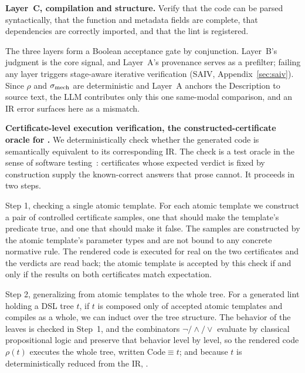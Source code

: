 \textbf{Layer~C, compilation and structure.} Verify that the code can be parsed
syntactically, that the function and metadata fields are complete, that
dependencies are correctly imported, and that the lint is registered.

The three layers form a Boolean acceptance gate by conjunction. Layer~B's
judgment is the core signal, and Layer~A's provenance serves as a
prefilter; failing any layer triggers stage-aware iterative verification
(SAIV, Appendix~\ref{sec:saiv}).
Since $\rho$ and $\sigma_{\mathrm{mech}}$ are deterministic and Layer~A anchors the Description
to source text, the LLM contributes only this one same-modal comparison, and an
IR error surfaces here as a mismatch.

\textbf{Certificate-level execution verification, the constructed-certificate
oracle for \CodeEqIR.} We deterministically check whether the generated code is semantically equivalent to its corresponding IR. The check is a test oracle in the sense of software testing~\cite{barr2015oracle}: certificates whose expected
verdict is fixed by construction supply the known-correct answers that prose
cannot. It proceeds in two steps.

Step 1, checking a single atomic template. For each atomic template we
construct a pair of controlled certificate samples, one that should
make the template's predicate true, and one that should make it false. The
samples are constructed by the atomic template's parameter types and are not
bound to any concrete normative rule. The rendered code is executed for real on the two
certificates and the verdicts are read back; the atomic template is accepted by
this check if and only if the results on both certificates match expectation.

Step 2, generalizing from atomic templates to the whole tree. For a
generated lint holding a DSL tree $t$, if $t$ is composed only of accepted
atomic templates and compiles as a whole, we can induct over the tree
structure. The behavior of the leaves is checked in Step~1, and the combinators
$\neg/\wedge/\vee$ evaluate by classical propositional logic and preserve that
behavior level by level, so the rendered code $\rho(t)$ executes the whole tree,
written $\mathrm{Code}\equiv t$; and because $t$ is deterministically reduced from
the IR, \CodeEqIR.

